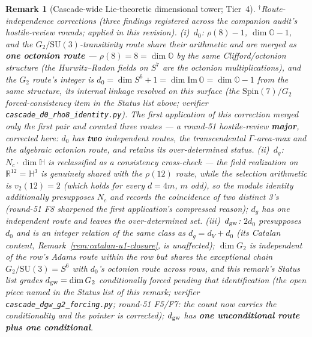 \documentclass[12pt,a4paper]{article}
\newtheorem*{remark}{Remark}
\begin{document}
\begin{remark}[Cascade-wide Lie-theoretic dimensional tower; Tier~4]
$^{\dagger}$\emph{Route-independence corrections (three findings registered across the companion audit's hostile-review rounds; applied in this revision).} (i)~$d_0$: $\rho(8)-1$, $\dim\mathbb{O}-1$, and the $G_2/\mathrm{SU}(3)$-transitivity route share their arithmetic and are merged as \textbf{one octonion route} --- $\rho(8) = 8 = \dim\mathbb{O}$ by the same Clifford/octonion structure (the Hurwitz--Radon fields on $S^7$ are the octonion multiplications), and the $G_2$ route's integer is $d_0 = \dim S^6 + 1 = \dim\mathrm{Im}\,\mathbb{O} = \dim\mathbb{O}-1$ from the same structure, its internal linkage \emph{resolved} on this surface (the $\mathrm{Spin}(7)/G_2$ forced-consistency item in the Status list above; verifier \texttt{cascade\_d0\_rho8\_identity.py}). The first application of this correction merged only the first pair and counted three routes --- a round-51 hostile-review \textbf{major}, corrected here: $d_0$ has \textbf{two} independent routes, the transcendental $\Gamma$-area-max and the algebraic octonion route, and retains its over-determined status. (ii)~$d_g$: $N_c\cdot\dim\mathbb{H}$ is reclassified as a consistency cross-check --- the field \emph{realization} on $\mathbb{R}^{12} = \mathbb{H}^3$ is genuinely shared with the $\rho(12)$ route, while the selection arithmetic is $v_2(12) = 2$ (which holds for every $d = 4m$, $m$ odd), so the module identity additionally presupposes $N_c$ and records the coincidence of two distinct 3's (round-51 F8 sharpened the first application's compressed reason); $d_g$ has one independent route and leaves the over-determined set. (iii)~$d_{\rm gw}$: $2d_0$ presupposes $d_0$ and is an integer relation of the same class as $d_g = d_V + d_0$ (its Catalan content, Remark~\ref{rem:catalan-u1-closure}, is unaffected); $\dim G_2$ is independent of the row's Adams route \emph{within the row} but shares the exceptional chain $G_2/\mathrm{SU}(3) = S^6$ with $d_0$'s octonion route \emph{across rows}, and this remark's Status list grades $d_{\rm gw} = \dim G_2$ \emph{conditionally forced} pending that identification (the open piece named in the Status list of this remark; verifier \texttt{cascade\_dgw\_g2\_forcing.py}; round-51 F5/F7: the count now carries the conditionality and the pointer is corrected); $d_{\rm gw}$ has \textbf{one unconditional route plus one conditional}.


\end{remark}
\end{document}
